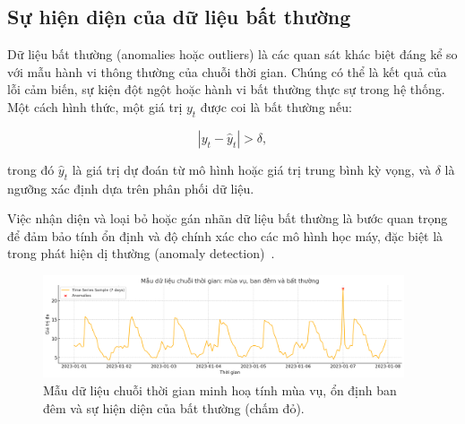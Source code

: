 \subsection{Sự hiện diện của dữ liệu bất thường}

Dữ liệu bất thường (anomalies hoặc outliers) là các quan sát khác biệt đáng kể so với mẫu hành vi thông thường của chuỗi thời gian. Chúng có thể là kết quả của lỗi cảm biến, sự kiện đột ngột hoặc hành vi bất thường thực sự trong hệ thống. Một cách hình thức, một giá trị \( y_t \) được coi là bất thường nếu:

\begin{equation}
    |y_t - \hat{y}_t| > \delta,
\end{equation}

trong đó \( \hat{y}_t \) là giá trị dự đoán từ mô hình hoặc giá trị trung bình kỳ vọng, và \( \delta \) là ngưỡng xác định dựa trên phân phối dữ liệu.

Việc nhận diện và loại bỏ hoặc gán nhãn dữ liệu bất thường là bước quan trọng để đảm bảo tính ổn định và độ chính xác cho các mô hình học máy, đặc biệt là trong phát hiện dị thường (anomaly detection)~\cite{hundman2018detecting, malhotra2016lstm}.

\begin{figure}[h]
    \centering
    \includegraphics[width=0.95\textwidth]{image/section3_2/time_series_example.png}
    \caption{Mẫu dữ liệu chuỗi thời gian minh hoạ tính mùa vụ, ổn định ban đêm và sự hiện diện của bất thường (chấm đỏ).}
    \label{fig:section3_2__1}
\end{figure}
